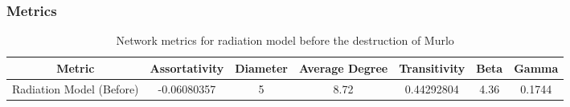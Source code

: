 \documentclass[12pt,a4paper]{thesis}
\begin{document}
\subsubsection{Metrics}


\begin{table}[H]
\centering
\caption{Network metrics for radiation model before the destruction of Murlo}
\tiny
\begin{tabular}{|c|c|c|c|c|c|c|}
\hline Metric & Assortativity & Diameter & Average Degree & Transitivity & Beta & Gamma \\ 
\hline Radiation Model (Before) & -0.06080357 & 5 & 8.72 & 0.44292804 & 4.36 & 0.1744 \\ 
\hline 
\end{tabular} 
\label{tab:radNetBefore}
\end{table}
\end{document}
